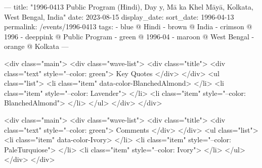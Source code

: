 ---
title: "1996-0413 Public Program (Hindi), Day y, Mā ka Khel Māyā, Kolkata, West Bengal, India"
date: 2023-08-15
display_date: 
sort_date: 1996-04-13
permalink: /events/1996-0413
tags:
  - blue @ Hindi
  - brown @ India
  - crimson @ 1996
  - deeppink @ Public Program
  - green @ 1996-04
  - maroon @ West Bengal
  - orange @ Kolkata
---

<div class="main">
  <div class="wave-list">
    <div class="title">
      <div class="text" style="--color: green">
        Key Quotes
      </div>
    </div>
    <ul class="list">
        <li class="item" data-color-BlanchedAlmond>
        </li>
        <li class="item" style="--color: Lavender">
        </li>
        <li class="item" style="--color: BlanchedAlmond">
        </li>
      </ul>
  </div>
</div>

<div class="main">
  <div class="wave-list">
    <div class="title">
      <div class="text" style="--color: green">
        Comments
      </div>
    </div>
    <ul class="list">
        <li class="item" data-color-Ivory>
        </li>
        <li class="item" style="--color: PaleTurquiose">
        </li>
        <li class="item" style="--color: Ivory">
        </li>
      </ul>
  </div>
</div>